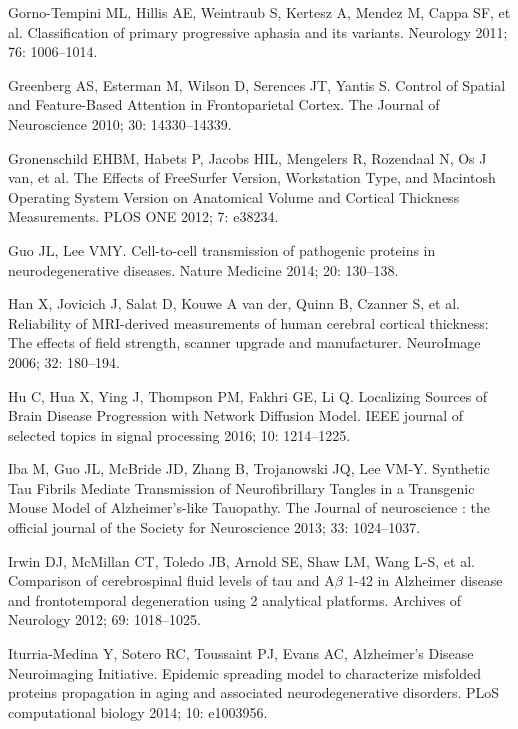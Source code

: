 \documentclass[]{article}
\begin{document}
\hypertarget{ref-gorno-tempini_classification_2011}{}
Gorno-Tempini ML, Hillis AE, Weintraub S, Kertesz A, Mendez M, Cappa SF,
et al. Classification of primary progressive aphasia and its variants.
Neurology 2011; 76: 1006--1014.

\hypertarget{ref-greenberg_control_2010}{}
Greenberg AS, Esterman M, Wilson D, Serences JT, Yantis S. Control of
Spatial and Feature-Based Attention in Frontoparietal Cortex. The
Journal of Neuroscience 2010; 30: 14330--14339.

\hypertarget{ref-gronenschild_effects_2012}{}
Gronenschild EHBM, Habets P, Jacobs HIL, Mengelers R, Rozendaal N, Os J
van, et al. The Effects of FreeSurfer Version, Workstation Type, and
Macintosh Operating System Version on Anatomical Volume and Cortical
Thickness Measurements. PLOS ONE 2012; 7: e38234.

\hypertarget{ref-guo_cell-to-cell_2014}{}
Guo JL, Lee VMY. Cell-to-cell transmission of pathogenic proteins in
neurodegenerative diseases. Nature Medicine 2014; 20: 130--138.

\hypertarget{ref-han_reliability_2006}{}
Han X, Jovicich J, Salat D, Kouwe A van der, Quinn B, Czanner S, et al.
Reliability of MRI-derived measurements of human cerebral cortical
thickness: The effects of field strength, scanner upgrade and
manufacturer. NeuroImage 2006; 32: 180--194.

\hypertarget{ref-hu_localizing_2016}{}
Hu C, Hua X, Ying J, Thompson PM, Fakhri GE, Li Q. Localizing Sources of
Brain Disease Progression with Network Diffusion Model. IEEE journal of
selected topics in signal processing 2016; 10: 1214--1225.

\hypertarget{ref-iba_synthetic_2013}{}
Iba M, Guo JL, McBride JD, Zhang B, Trojanowski JQ, Lee VM-Y. Synthetic
Tau Fibrils Mediate Transmission of Neurofibrillary Tangles in a
Transgenic Mouse Model of Alzheimer's-like Tauopathy. The Journal of
neuroscience : the official journal of the Society for Neuroscience
2013; 33: 1024--1037.

\hypertarget{ref-irwin_comparison_2012}{}
Irwin DJ, McMillan CT, Toledo JB, Arnold SE, Shaw LM, Wang L-S, et al.
Comparison of cerebrospinal fluid levels of tau and A\(\beta\) 1-42 in
Alzheimer disease and frontotemporal degeneration using 2 analytical
platforms. Archives of Neurology 2012; 69: 1018--1025.

\hypertarget{ref-iturria-medina_epidemic_2014}{}
Iturria-Medina Y, Sotero RC, Toussaint PJ, Evans AC, Alzheimer's Disease
Neuroimaging Initiative. Epidemic spreading model to characterize
misfolded proteins propagation in aging and associated neurodegenerative
disorders. PLoS computational biology 2014; 10: e1003956.
\end{document}
